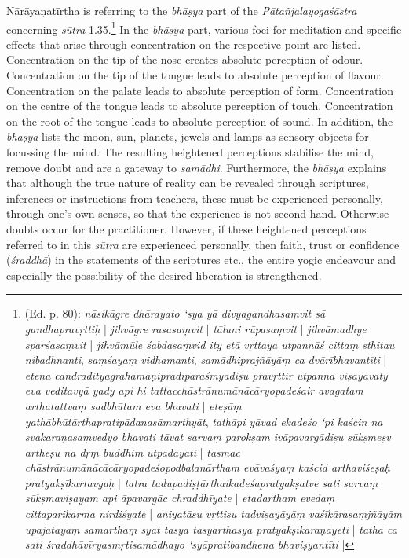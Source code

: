   Nārāyaṇatīrtha is referring to the \textit{bhāṣya} part of the \textit{Pātañjalayogaśāstra} concerning \textit{sūtra} 1.35.\footnote{ (Ed. p. 80): \textit{nāsikāgre dhārayato ‘sya yā divyagandhasaṃvit sā gandhapravṛttiḥ} | \textit{jihvāgre rasasaṃvit} | \textit{tāluni rūpasaṃvit} | \textit{jihvāmadhye sparśasaṃvit} | \textit{jihvāmūle śabdasaṃvid ity etā vṛttaya utpannāś cittaṃ sthitau nibadhnanti}, \textit{saṃśayaṃ vidhamanti}, \textit{samādhiprajñāyāṃ ca dvārībhavantīti} | \textit{etena candrādityagrahamaṇipradīparaśmyādiṣu pravṛttir utpannā viṣayavaty eva veditavyā yady api hi tattacchāstrānumānācāryopadeśair avagatam arthatattvaṃ sadbhūtam eva bhavati} | \textit{eteṣāṃ yathābhūtārthapratipādanasāmarthyāt}, \textit{tathāpi yāvad ekadeśo ‘pi kaścin na svakaraṇasaṃvedyo bhavati tāvat sarvaṃ parokṣam ivāpavargādiṣu sūkṣmeṣv artheṣu na dṛṃ buddhim utpādayati} | \textit{tasmāc chāstrānumānācācāryopadeśopodbalanārtham evāvaśyaṃ kaścid arthaviśeṣaḥ pratyakṣīkartavyaḥ} | \textit{tatra tadupadiṣṭārthaikadeśapratyakṣatve sati sarvaṃ sūkṣmaviṣayam api āpavargāc chraddhīyate} | \textit{etadartham evedaṃ cittaparikarma nirdiśyate} | \textit{aniyatāsu vṛttiṣu tadviṣayāyāṃ vaśīkārasaṃjñāyām upajātāyāṃ samarthaṃ syāt tasya tasyārthasya pratyakṣīkaraṇāyeti} | \textit{tathā ca sati śraddhāvīryasmṛtisamādhayo ‘syāpratibandhena bhaviṣyantīti} |} In the \textit{bhāṣya} part, various foci for meditation and specific effects that arise through concentration on the respective point are listed. Concentration on the tip of the nose creates absolute perception of odour. Concentration on the tip of the tongue leads to absolute perception of flavour. Concentration on the palate leads to absolute perception of form. Concentration on the centre of the tongue leads to absolute perception of touch. Concentration on the root of the tongue leads to absolute perception of sound. In addition, the \textit{bhāṣya} lists the moon, sun, planets, jewels and lamps as sensory objects for focussing the mind. The resulting heightened perceptions stabilise the mind, remove doubt and are a gateway to \textit{samādhi}. Furthermore, the \textit{bhāṣya} explains that although the true nature of reality can be revealed through scriptures, inferences or instructions from teachers, these must be experienced personally, through one's own senses, so that the experience is not second-hand. Otherwise doubts occur for the practitioner. However, if these heightened perceptions referred to in this \textit{sūtra} are experienced personally, then faith, trust or confidence (\textit{śraddhā}) in the statements of the scriptures etc., the entire yogic endeavour and especially the possibility of the desired liberation is strengthened.

